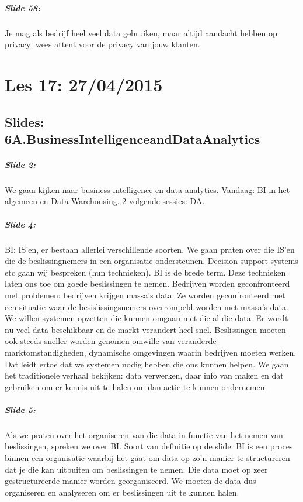 \documentclass[10pt,a4paper]{report}
\begin{document}
\paragraph{Slide 58:}Je mag als bedrijf heel veel data gebruiken, maar altijd aandacht hebben op privacy: wees attent voor de privacy van jouw klanten.

\chapter{Les 17: 27/04/2015}
\section{Slides: 6A.BusinessIntelligenceandDataAnalytics}

\paragraph{Slide 2:}We gaan kijken naar business intelligence en data analytics. Vandaag: BI in het algemeen en Data Warehousing. 2 volgende sessies: DA.

\paragraph{Slide 4:}BI: IS'en, er bestaan allerlei verschillende soorten. We gaan praten over die IS'en die de beslissingnemers in een organisatie ondersteunen. Decision support systems etc gaan wij bespreken (hun technieken). BI is de brede term. Deze technieken laten ons toe om goede beslissingen te nemen. Bedrijven worden geconfronteerd met problemen: bedrijven krijgen massa's data. Ze worden geconfronteerd met een situatie waar de besislissingsnemers overrompeld worden met massa's data. We willen systemen opzetten die kunnen omgaan met die al die data. Er wordt nu veel data beschikbaar en de markt verandert heel snel. Beslissingen moeten ook steeds sneller worden genomen omwille van veranderde marktomstandigheden, dynamische omgevingen waarin bedrijven moeten werken. Dat leidt ertoe dat we systemen nodig hebben die ons kunnen helpen. We gaan het traditionele verhaal bekijken: data verwerken, daar info van maken en dat gebruiken om er kennis uit te halen om dan actie te kunnen ondernemen.

\paragraph{Slide 5:}Als we praten over het organiseren van die data in functie van het nemen van beslissingen, spreken we over BI. Soort van definitie op de slide: BI is een proces binnen een organisatie waarbij het gaat om data op zo'n manier te structureren dat je die kan uitbuiten om beslissingen te nemen. Die data moet op zeer gestructureerde manier worden georganiseerd. We moeten de data dus organiseren en analyseren om er beslissingen uit te kunnen halen.
\end{document}
